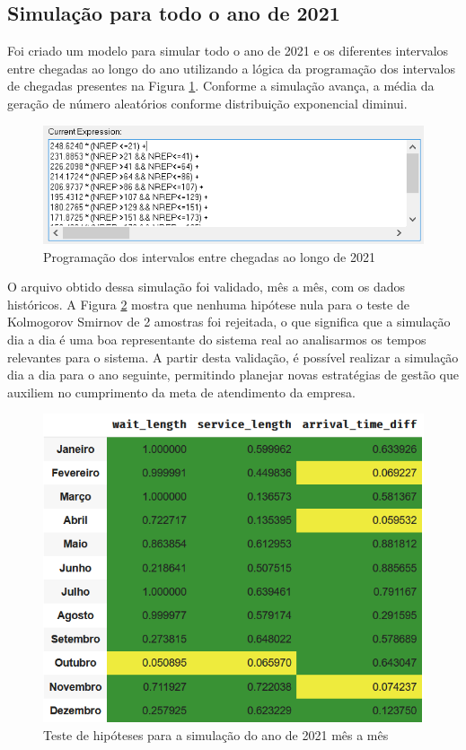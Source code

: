 \subsection{Simulação para todo o ano de 2021}
Foi criado um modelo para simular todo o ano de 2021 e os diferentes intervalos entre chegadas ao longo do ano utilizando a lógica da programação dos intervalos de chegadas presentes na Figura \ref*{fig: logica-2021}. Conforme a simulação avança, a média da geração de número aleatórios conforme distribuição exponencial diminui.

\begin{figure}[H]
    \centering
    \includegraphics[scale=1.2]{simulacao/logica-2021.png}
    \caption{Programação dos intervalos entre chegadas ao longo de 2021}
    \label{fig: logica-2021}
\end{figure}

O arquivo obtido dessa simulação foi validado, mês a mês, com os dados históricos. A Figura \ref*{fig: validacao-sim-2021} mostra que nenhuma hipótese nula para o teste de Kolmogorov Smirnov de 2 amostras foi rejeitada, o que significa que a simulação dia a dia é uma boa representante do sistema real ao analisarmos os tempos relevantes para o sistema. A partir desta validação, é possível realizar a simulação dia a dia para o ano seguinte, permitindo planejar novas estratégias de gestão que auxiliem no cumprimento da meta de atendimento da empresa.

\begin{figure}[H]
    \centering
    \includegraphics[scale=1]{simulacao/validacao-sim-2021.png}
    \caption{Teste de hipóteses para a simulação do ano de 2021 mês a mês}
    \label{fig: validacao-sim-2021}
\end{figure}
